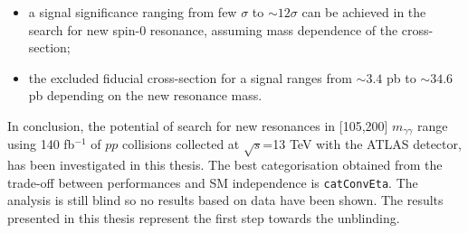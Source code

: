 \documentclass[a4paper, oneside, 11pt]{book}
\begin{document}
	\begin{itemize}
		\item a signal significance ranging from few $\sigma$ to $\sim12\sigma$ can be achieved in the search for new spin-0 resonance, assuming mass dependence of the cross-section;
		\item the excluded fiducial cross-section for a signal ranges from $\sim 3.4$ pb to $\sim 34.6$ pb depending on the new resonance mass.
	\end{itemize}

	In conclusion, the potential of search for new resonances in [105,200] $m_{\gamma\gamma}$ range using 140 fb$^{-1}$ of $pp$ collisions collected at $\sqrt{s}$=13 TeV with the ATLAS detector, has been investigated in this thesis. The best categorisation obtained from the trade-off between performances and SM independence is \texttt{catConvEta}. The analysis is still blind so no results based on data have been shown. The results presented in this thesis represent the first step towards the unblinding.%
	
	
	
\end{document}
